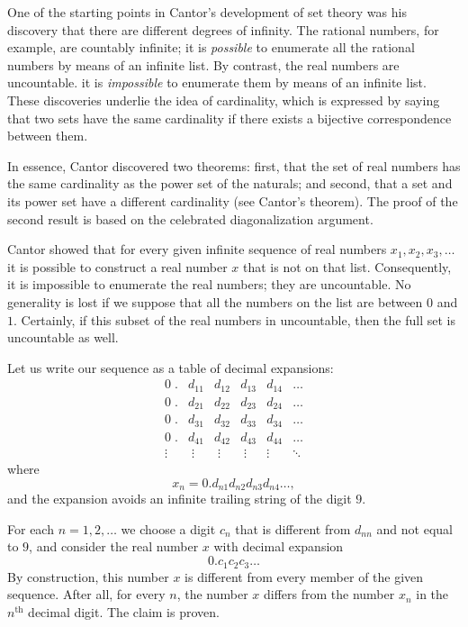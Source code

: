 \documentclass{article}
\begin{document}
 One of the starting points in
Cantor's development of set theory was his discovery that there are
different degrees of infinity.  The rational numbers, for example, are
countably infinite; it is \emph{possible} to enumerate all the rational
numbers by means of an infinite list.  By contrast, the real numbers
are uncountable. it is \emph{impossible} to enumerate them by means of an
infinite list.  These discoveries underlie the idea of cardinality,
which is expressed by saying that two sets have the same cardinality
if there exists a bijective correspondence between them.   

In essence, Cantor discovered two theorems: first, that the set of
real numbers has the same cardinality as the power set of the
naturals; and second, that a set and its power set have a different
cardinality (see Cantor's theorem).  The proof of the second result
is based on the celebrated diagonalization argument.

Cantor showed that for every given infinite sequence of real numbers
$x_1, x_2, x_3, \ldots$ it is possible to construct a real number $x$
that is not on that list.  Consequently, it is impossible to enumerate
the real numbers; they are uncountable.  No generality is lost if we
suppose that all the numbers on the list are between $0$ and $1$.
Certainly, if this subset of the real numbers in uncountable, then the
full set is uncountable as well.  

Let us write our sequence as a table of decimal expansions:
$$
\begin{array}{rlllll}
0\;.&d_{11}&d_{12}&d_{13}&d_{14}&\ldots\\
0\;.&d_{21}&d_{22}&d_{23}&d_{24}&\ldots\\
0\;.&d_{31}&d_{32}&d_{33}&d_{34}&\ldots\\
0\;.&d_{41}&d_{42}&d_{43}&d_{44}&\ldots\\
\vdots\; & \;\vdots&\;\vdots&\;\vdots\;&\vdots&\ddots
\end{array}
$$
where
$$x_n = 0.d_{n1} d_{n2} d_{n3} d_{n4}\ldots,$$
and the expansion avoids an infinite trailing string of
the digit $9$.

For each $n=1,2,\ldots$ we choose a digit $c_n$ that is different from
$d_{nn}$ and not equal to $9$, and consider  the real number $x$ with
decimal expansion
$$0.c_1c_2c_3\ldots$$
By construction, this number $x$ is different from every member of the
given sequence.  After all, for every $n$, the number $x$ differs from
the number $x_n$ in the $n^{\scriptscriptstyle \text{th}}$ decimal
digit.
The claim is proven.
\end{document}

